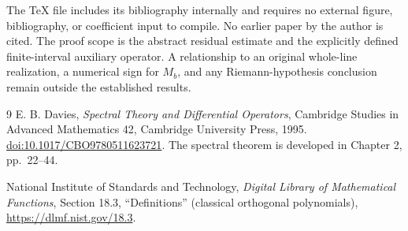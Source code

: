 \documentclass[11pt,a4paper]{article}
\theoremstyle{remark}
\numberwithin{equation}{section}
\begin{document}
The TeX file includes its bibliography internally and requires no external
figure, bibliography, or coefficient input to compile. No earlier paper by
the author is cited. The proof scope is the abstract residual estimate and
the explicitly defined finite-interval auxiliary operator. A relationship
to an original whole-line realization, a numerical sign for $M_b$, and any
Riemann-hypothesis conclusion remain outside the established results.

\begin{thebibliography}{9}
E. B. Davies,
\emph{Spectral Theory and Differential Operators},
Cambridge Studies in Advanced Mathematics 42,
Cambridge University Press, 1995.
\href{https://doi.org/10.1017/CBO9780511623721}{doi:10.1017/CBO9780511623721}.
The spectral theorem is developed in Chapter 2, pp.~22--44.

National Institute of Standards and Technology,
\emph{Digital Library of Mathematical Functions},
Section 18.3, ``Definitions'' (classical orthogonal polynomials),
\url{https://dlmf.nist.gov/18.3}.
\end{thebibliography}
\end{document}
